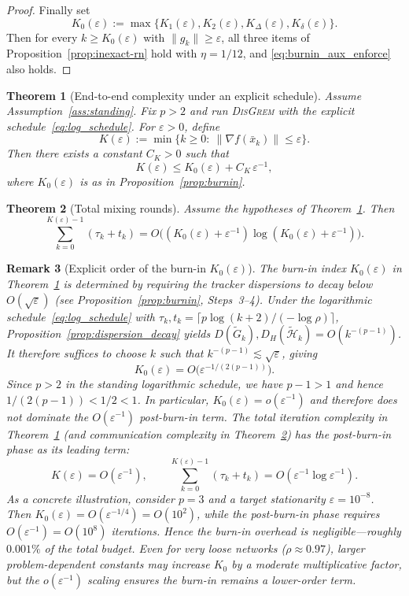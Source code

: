 \documentclass[10pt,twocolumn,letterpaper]{article}
\def\cO{O}%
\theoremstyle{compact}
\newtheorem{theorem}{Theorem}[section]
\theoremstyle{compactremark}
\newtheorem{remark}[theorem]{Remark}
\newcommand{\cO}{\mathcal{O}}
\begin{document}
\begin{proof}
\vspace{1pt}
Finally set
\[
K_0(\varepsilon):=\max\{K_1(\varepsilon),K_2(\varepsilon),K_\Delta(\varepsilon),K_\delta(\varepsilon)\}.
\]
Then for every $k\ge K_0(\varepsilon)$ with $\|g_k\|\ge \varepsilon$, all three items of Proposition~\ref{prop:inexact-rn} hold with $\eta=1/12$,
and \eqref{eq:burnin_aux_enforce} also holds.
\end{proof}

\begin{theorem}[End-to-end complexity under an explicit schedule]\label{thm:end2end}
Assume Assumption~\ref{ass:standing}. Fix $p>2$ and run \textsc{DisGrem} with the explicit schedule~\eqref{eq:log_schedule}.
For $\varepsilon>0$, define
\[
K(\varepsilon):=\min\{k\ge 0:\ \|\nabla f(\bar x_k)\|\le \varepsilon\}.
\]
Then there exists a constant $C_K>0$ such that
\[
K(\varepsilon)\le K_0(\varepsilon)+C_K\,\varepsilon^{-1},
\]
where $K_0(\varepsilon)$ is as in Proposition~\ref{prop:burnin}.
\end{theorem}

\begin{theorem}[Total mixing rounds]\label{thm:comm}
Assume the hypotheses of Theorem~\ref{thm:end2end}. Then
\[
\sum_{k=0}^{K(\varepsilon)-1}(\tau_k+t_k)
=\cO\!\Big((K_0(\varepsilon)+\varepsilon^{-1})\log(K_0(\varepsilon)+\varepsilon^{-1})\Big).
\]
\end{theorem}

\begin{remark}[Explicit order of the burn-in $K_0(\varepsilon)$]\label{rem:burnin_order_app}
The burn-in index $K_0(\varepsilon)$ in Theorem~\ref{thm:end2end} is
determined by requiring the tracker dispersions to decay below
$\cO(\sqrt\varepsilon)$ (see Proposition~\ref{prop:burnin}, Steps~3--4).
Under the logarithmic schedule~\eqref{eq:log_schedule} with
$\tau_k,t_k=\lceil p\log(k+2)/(-\log\rho)\rceil$,
Proposition~\ref{prop:dispersion_decay} yields
$D(\tilde G_k),D_H(\tilde{\mathcal H}_k)=\cO(k^{-(p-1)})$.
It therefore suffices to choose $k$ such that $k^{-(p-1)}\lesssim\sqrt\varepsilon$,
giving
\[
K_0(\varepsilon)=\cO\!\big(\varepsilon^{-1/(2(p-1))}\big).
\]
Since $p>2$ in the standing logarithmic schedule, we have $p-1>1$
and hence $1/(2(p-1))<1/2<1$.
In particular, $K_0(\varepsilon)=o(\varepsilon^{-1})$ and therefore
\emph{does not dominate} the $\cO(\varepsilon^{-1})$ post-burn-in term.
The total iteration complexity in Theorem~\ref{thm:end2end}
(and communication complexity in Theorem~\ref{thm:comm}) has the
post-burn-in phase as its leading term:
\[
K(\varepsilon)=\cO(\varepsilon^{-1}),
\qquad
\sum_{k=0}^{K(\varepsilon)-1}(\tau_k+t_k)
=\cO(\varepsilon^{-1}\log\varepsilon^{-1}).
\]
As a concrete illustration, consider $p=3$ and a target stationarity
$\varepsilon=10^{-8}$.
Then $K_0(\varepsilon)=\cO(\varepsilon^{-1/4})=\cO(10^{2})$,
while the post-burn-in phase requires $\cO(\varepsilon^{-1})=\cO(10^{8})$
iterations.
Hence the burn-in overhead is negligible---roughly $0.001\%$
of the total budget.
Even for very loose networks ($\rho\approx0.97$), larger
problem-dependent constants may increase $K_0$ by a moderate
multiplicative factor, but the $o(\varepsilon^{-1})$ scaling ensures
the burn-in remains a lower-order term.
\end{remark}
\end{document}
